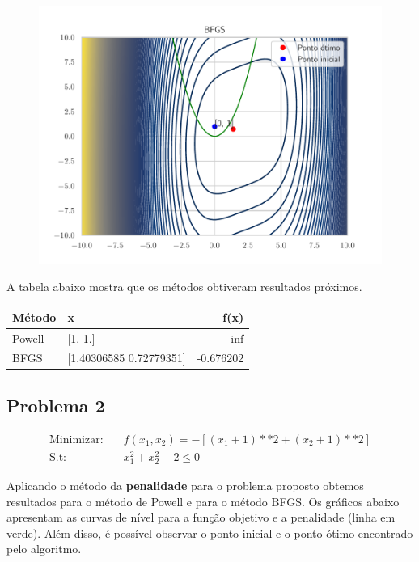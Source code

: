 \documentclass[12pt]{article}
\begin{document}
\begin{figure}[H]
  \centering
  \includegraphics[scale = 0.6]{barreira_BFGS_[0 1].pdf}
\end{figure}

A tabela abaixo mostra que os métodos obtiveram resultados próximos.

\begin{table}[H]
\centering
\begin{tabular}{llr}
  \hline
  Método & x & f(x) \\
  \hline
  Powell & [1. 1.] & -inf \\
  BFGS & [1.40306585 0.72779351] & -0.676202 \\
  \hline
  \end{tabular}
\end{table}

\subsection{Problema 2}

\begin{equation}
  \begin{aligned}
      \text{Minimizar:} \quad & f(x_1, x_2) = -[(x_{1}+1)**2+(x_{2}+1)**2] \\
      \text{S.t:} \quad & x_1^2 + x_2^{2} - 2 \leq 0
  \end{aligned}
\end{equation}

Aplicando o método da \textbf{penalidade} para o problema proposto obtemos resultados para o método de Powell e para o método BFGS. Os gráficos abaixo apresentam as curvas de nível para a função objetivo e a penalidade (linha em verde). Além disso, é possível observar o ponto inicial e o ponto ótimo encontrado pelo algoritmo.
\end{document}
